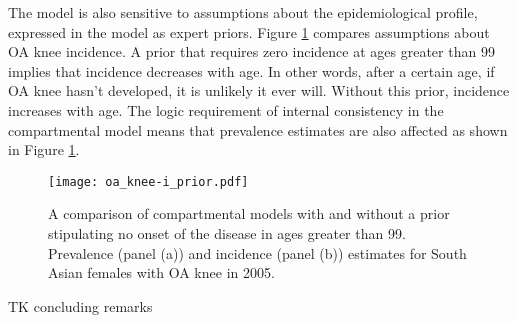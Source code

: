 The model is also sensitive to assumptions about the epidemiological
profile, expressed in the model as expert priors.  Figure
\ref{fig:app-oa knee priors} compares assumptions about OA knee
incidence.  A prior that requires zero incidence at ages greater than
99 implies that incidence decreases with age.  In other words, after a
certain age, if OA knee hasn't developed, it is unlikely it ever
will. Without this prior, incidence increases with age.  The logic
requirement of internal consistency in the compartmental model means
that prevalence estimates are also affected as shown in Figure
\ref{fig:app-oa knee priors}.

    \begin{figure}[h]
        \begin{center}
            \texttt{[image: oa\_knee-i\_prior.pdf]}
            \caption{A comparison of compartmental models with and
              without a prior stipulating no onset of the disease in
              ages greater than 99.  Prevalence (panel (a)) and
              incidence (panel (b)) estimates for South Asian females
              with OA knee in 2005.}
            \label{fig:app-oa knee priors}
        \end{center}
    \end{figure}

TK concluding remarks